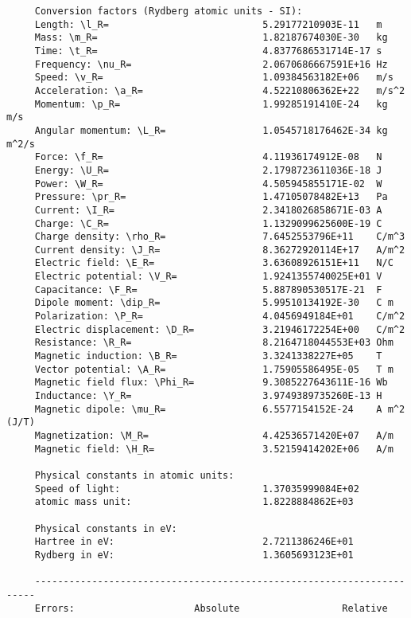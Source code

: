 \documentclass[12pt,a4paper]{article}
\begin{document}
\begin{verbatim}
     Conversion factors (Rydberg atomic units - SI):
     Length: \l_R=                           5.29177210903E-11   m
     Mass: \m_R=                             1.82187674030E-30   kg
     Time: \t_R=                             4.8377686531714E-17 s
     Frequency: \nu_R=                       2.0670686667591E+16 Hz
     Speed: \v_R=                            1.09384563182E+06   m/s
     Acceleration: \a_R=                     4.52210806362E+22   m/s^2
     Momentum: \p_R=                         1.99285191410E-24   kg m/s
     Angular momentum: \L_R=                 1.0545718176462E-34 kg m^2/s
     Force: \f_R=                            4.11936174912E-08   N
     Energy: \U_R=                           2.1798723611036E-18 J
     Power: \W_R=                            4.505945855171E-02  W
     Pressure: \pr_R=                        1.47105078482E+13   Pa
     Current: \I_R=                          2.3418026858671E-03 A
     Charge: \C_R=                           1.1329099625600E-19 C
     Charge density: \rho_R=                 7.6452553796E+11    C/m^3
     Current density: \J_R=                  8.36272920114E+17   A/m^2
     Electric field: \E_R=                   3.63608926151E+11   N/C
     Electric potential: \V_R=               1.9241355740025E+01 V
     Capacitance: \F_R=                      5.887890530517E-21  F
     Dipole moment: \dip_R=                  5.99510134192E-30   C m
     Polarization: \P_R=                     4.0456949184E+01    C/m^2
     Electric displacement: \D_R=            3.21946172254E+00   C/m^2
     Resistance: \R_R=                       8.2164718044553E+03 Ohm
     Magnetic induction: \B_R=               3.3241338227E+05    T
     Vector potential: \A_R=                 1.75905586495E-05   T m
     Magnetic field flux: \Phi_R=            9.3085227643611E-16 Wb
     Inductance: \Y_R=                       3.9749389735260E-13 H
     Magnetic dipole: \mu_R=                 6.5577154152E-24    A m^2 (J/T)
     Magnetization: \M_R=                    4.42536571420E+07   A/m
     Magnetic field: \H_R=                   3.52159414202E+06   A/m

     Physical constants in atomic units:
     Speed of light:                         1.37035999084E+02
     atomic mass unit:                       1.8228884862E+03

     Physical constants in eV:
     Hartree in eV:                          2.7211386246E+01
     Rydberg in eV:                          1.3605693123E+01

     ----------------------------------------------------------------------
     Errors:                     Absolute                  Relative


\end{verbatim}
\end{document}
